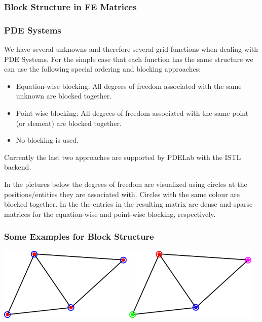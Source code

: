 {\subsubsection{Block Structure in FE Matrices}
\label{sec:motivation}
\begin{frame} \frametitle{PDE Systems}
  \begin{block}{}
      We have several unknowns and therefore several grid functions
      when dealing with PDE Systems.
      For the simple case that each function has the same structure we
      can use the following special ordering and blocking approaches:
  \begin{itemize}
  \item Equation-wise blocking: All degrees of freedom associated with
    the same unknown are blocked together.
  \item Point-wise blocking: All degrees of freedom associated with
    the same point (or element) are blocked together.
  \item No blocking is used.
  \end{itemize}
  \end{block}
  Currently the last two approaches are supported by PDELab with the
  ISTL backend.
\end{frame}
In the pictures below the degrees of freedom are visualized using
circles at the positions/entities they are associated with. Circles
with the same colour are blocked together. In the the entries in the
resulting matrix are dense and sparse matrices for the equation-wise
and point-wise blocking, respectively.
\begin{frame}
\frametitle{Some Examples for Block Structure}
\begin{block}{}
\includegraphics[width=0.48\textwidth]{./EPS/P1P1}\hfill
\includegraphics[width=0.48\textwidth]{./EPS/P1P1b}


\end{block}
\end{frame}}
